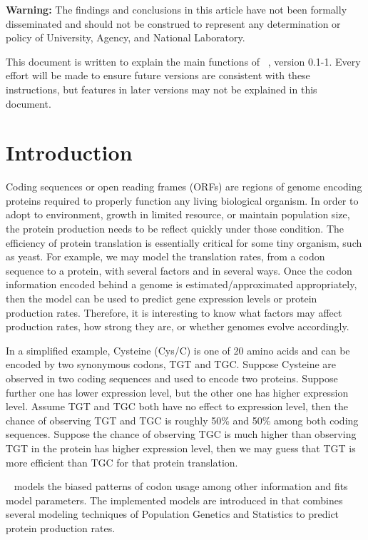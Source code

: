 
{\color{red} \bf Warning:}
The findings and conclusions in this article have not been
formally disseminated
and should not be construed to represent any determination or
policy of University, Agency, and National Laboratory.

This document is written to explain the main
functions of ~\citep{Chen2014cubfitspackage}, version 0.1-1.
Every effort will be made to ensure future versions are consistent with
these instructions, but features in later versions may not be explained
in this document.




\section[Introduction]{Introduction}
\label{sec:introduction}

Coding sequences or open reading frames (ORFs) are regions of genome encoding
proteins required to properly function any living biological organism.
In order to adopt to environment, growth in limited resource, or
maintain population size, the protein production needs to be reflect quickly
under those condition. The efficiency of protein translation is essentially
critical for some tiny organism, such as yeast.
For example, we may model the translation rates,
from a codon sequence to a protein,
with several factors and in several ways.
Once the codon information
encoded behind a genome is estimated/approximated appropriately, then
the model can be used to predict gene expression levels or protein production
rates. Therefore, it is interesting
to know what factors may affect production rates, how strong they are, or
whether genomes evolve accordingly.

In a simplified example, Cysteine (Cys/C) is one of 20 amino acids and
can be encoded by two synonymous codons, TGT and TGC. Suppose Cysteine are
observed in two coding sequences and used to encode two proteins.
Suppose further one has lower expression level, but the other one has higher
expression level. Assume TGT and TGC both have no effect to expression level,
then the chance of observing TGT and TGC is roughly 50\% and 50\% among
both coding sequences. Suppose the chance of observing TGC is much higher
than observing TGT in the protein has higher expression level, then we
may guess that TGT is more efficient than TGC for that protein translation.

~\citep{Chen2014cubfitspackage} models the biased patterns of codon usage among other
information and fits model parameters. The implemented models are introduced
in \citep{Gilchrist2007,Shah2011,Wallace2013}
that combines several
modeling techniques of Population Genetics and Statistics to
predict protein production rates.

